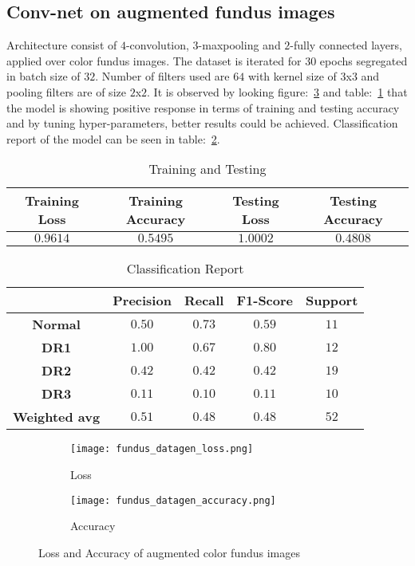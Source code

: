 \documentclass[12pt,a4paper,titlepage]{report}
\begin{document}
\subsection{Conv-net on augmented fundus images}
Architecture consist of $4$-convolution, $3$-maxpooling and $2$-fully connected layers, applied over color fundus images. The dataset is iterated for $30$ epochs segregated in batch size of $32$. Number of filters used are $64$ with kernel size of $3$x$3$ and pooling filters are of size $2$x$2$. It is observed by looking figure:~\ref{fig: Image3} and table:~\ref{tab: Table-6} that the model is showing positive response in terms of training and testing accuracy and by tuning hyper-parameters, better results could be achieved. Classification report of the model can be seen in table:~\ref{tab: Table-7}. \vspace{10pt}
\vspace{20pt}
\begin{table}[H]
\centering
\caption{Training and Testing}
\label{tab: Table-6}
\begin{tabular}{c c c c}
\hline
\textbf{Training Loss} & \textbf{Training Accuracy} & \textbf{Testing Loss} & \textbf{Testing Accuracy}\\
\hline
$0.9614$ & $0.5495$ & $1.0002$ & $0.4808$\\
\hline
\end{tabular}
\end{table}
\vspace{20pt}

\begin{table}[H]
\centering
\caption{Classification Report}
\label{tab: Table-7}
\begin{tabular}{c c c c c}
\hline
\textbf{} & \textbf{Precision} & \textbf{Recall} & \textbf{F1-Score} & \textbf{Support} \\
\hline
\textbf{Normal} & $0.50$ & $0.73$ & $0.59$ & $11$\\
\textbf{DR1} & $1.00$ & $0.67$ & $0.80$ & $12$\\
\textbf{DR2} & $0.42$ & $0.42$ & $0.42$ & $19$\\
\textbf{DR3} & $0.11$ & $0.10$ & $0.11$ & $10$\\
\textbf{Weighted avg} & $0.51$ & $0.48$ & $0.48$ & $52$\\
\hline
\end{tabular}
\end{table}

\begin{figure}[H]
\centering
\begin{subfigure}[h]{0.45\linewidth}
\texttt{[image: fundus\_datagen\_loss.png]}
\caption{Loss}
\label{fig:a}
\end{subfigure}
\quad
\begin{subfigure}[h]{0.45\linewidth}
\texttt{[image: fundus\_datagen\_accuracy.png]}
\caption{Accuracy}
\label{fig:b}
\end{subfigure}
\caption{Loss and Accuracy of augmented color fundus images}
\label{fig: Image3}
\end{figure}
\end{document}
